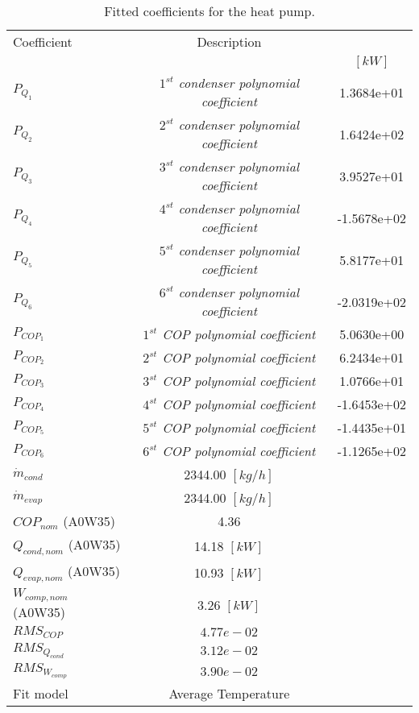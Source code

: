 \documentclass[english]{SPFShortReport}
\author{Dani Carbonell}
\begin{document}
\begin{table}[!ht]
\begin{small}
\caption{Fitted coefficients for the heat pump.}
\begin{center}
\resizebox{12cm}{!} 
{
\begin{tabular}{l | c c } 
\hline
\hline
Coefficient &Description & \\ 
 & &$[kW]$\\ 
\hline
$P_{Q_{1}}$ & \emph{$1^{st}$ condenser polynomial coefficient}  & 1.3684e+01    \\ 
$P_{Q_{2}}$ & \emph{$2^{st}$ condenser polynomial coefficient}  & 1.6424e+02    \\ 
$P_{Q_{3}}$ & \emph{$3^{st}$ condenser polynomial coefficient}  & 3.9527e+01    \\ 
$P_{Q_{4}}$ & \emph{$4^{st}$ condenser polynomial coefficient}  & -1.5678e+02    \\ 
$P_{Q_{5}}$ & \emph{$5^{st}$ condenser polynomial coefficient}  & 5.8177e+01    \\ 
$P_{Q_{6}}$ & \emph{$6^{st}$ condenser polynomial coefficient}  & -2.0319e+02    \\ 
\hline
$P_{COP_{1}}$ & \emph{$1^{st}$ COP polynomial coefficient}  & 5.0630e+00    \\ 
$P_{COP_{2}}$ & \emph{$2^{st}$ COP polynomial coefficient}  & 6.2434e+01    \\ 
$P_{COP_{3}}$ & \emph{$3^{st}$ COP polynomial coefficient}  & 1.0766e+01    \\ 
$P_{COP_{4}}$ & \emph{$4^{st}$ COP polynomial coefficient}  & -1.6453e+02    \\ 
$P_{COP_{5}}$ & \emph{$5^{st}$ COP polynomial coefficient}  & -1.4435e+01    \\ 
$P_{COP_{6}}$ & \emph{$6^{st}$ COP polynomial coefficient}  & -1.1265e+02    \\ 
\hline
$\dot m_{cond}$ & 2344.00 $[kg/h]$ \\ 
$\dot m_{evap}$ & 2344.00 $[kg/h]$ \\ 
\hline
$COP_{nom}$ (A0W35)& 4.36 \\ 
$Q_{cond,nom}$ (A0W35)& 14.18 $[kW]$\\ 
$Q_{evap,nom}$ (A0W35)& 10.93 $[kW]$\\ 
$W_{comp,nom}$ (A0W35)& 3.26 $[kW]$\\ 
\hline
 $RMS_{COP}$ & $4.77e-02$ \\ 
 $RMS_{Q_{cond}}$ & $3.12e-02$ \\ 
 $RMS_{W_{comp}}$ & $3.90e-02$ \\ 
\hline
Fit model & Average Temperature\\ 
\hline
\hline
\end{tabular}
}
\label{CoefTable}
\end{center}
\end{small}
\end{table}
\end{document}
